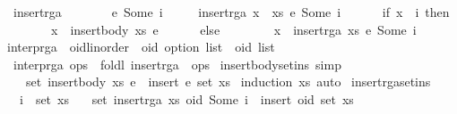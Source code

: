\begin{isabellebody}
\ \ {\isachardoublequoteopen}insert{\isacharunderscore}rga\ \ {\isacharbrackleft}{\isacharbrackright}\ \ \ \ \ \ {\isacharparenleft}e{\isacharcomma}\ Some\ i{\isacharparenright}\ {\isacharequal}\ {\isacharbrackleft}{\isacharbrackright}{\isachardoublequoteclose}\ {\isacharbar}\isanewline
\ \ {\isachardoublequoteopen}insert{\isacharunderscore}rga\ {\isacharparenleft}x\ {\isacharhash}\ xs{\isacharparenright}\ {\isacharparenleft}e{\isacharcomma}\ Some\ i{\isacharparenright}\ {\isacharequal}\isanewline
\ \ \ \ \ {\isacharparenleft}if\ x\ {\isacharequal}\ i\ then\isanewline
\ \ \ \ \ \ \ \ x\ {\isacharhash}\ insert{\isacharunderscore}body\ xs\ e\isanewline
\ \ \ \ \ \ else\isanewline
\ \ \ \ \ \ \ \ x\ {\isacharhash}\ insert{\isacharunderscore}rga\ xs\ {\isacharparenleft}e{\isacharcomma}\ Some\ i{\isacharparenright}{\isacharparenright}{\isachardoublequoteclose}\isanewline
\isanewline
{}\isamarkupfalse%
\ interp{\isacharunderscore}rga\ {\isacharcolon}{\isacharcolon}\ {\isachardoublequoteopen}{\isacharparenleft}{\isacharprime}oid{\isacharcolon}{\isacharcolon}{\isacharbraceleft}linorder{\isacharbraceright}\ {\isasymtimes}\ {\isacharprime}oid\ option{\isacharparenright}\ list\ {\isasymRightarrow}\ {\isacharprime}oid\ list{\isachardoublequoteclose}\ \isanewline
\ \ {\isachardoublequoteopen}interp{\isacharunderscore}rga\ ops\ {\isasymequiv}\ foldl\ insert{\isacharunderscore}rga\ {\isacharbrackleft}{\isacharbrackright}\ ops{\isachardoublequoteclose}%
\isamarkuptrue%
\isamarkupfalse%
\ insert{\isacharunderscore}body{\isacharunderscore}set{\isacharunderscore}ins\ {\isacharbrackleft}simp{\isacharbrackright}{\isacharcolon}\isanewline
\ \ \ \ {\isachardoublequoteopen}set\ {\isacharparenleft}insert{\isacharunderscore}body\ xs\ e{\isacharparenright}\ {\isacharequal}\ insert\ e\ {\isacharparenleft}set\ xs{\isacharparenright}{\isachardoublequoteclose}\isanewline
%
\isadelimproof
%
\endisadelimproof
%
\isatagproof
{}\isamarkupfalse%
\ {\isacharparenleft}induction\ xs{\isacharcomma}\ auto{\isacharparenright}%
\endisatagproof
{\isafoldproof}%
%
\isadelimproof
\isanewline
%
\endisadelimproof
\isanewline
{}\isamarkupfalse%
\ insert{\isacharunderscore}rga{\isacharunderscore}set{\isacharunderscore}ins{\isacharcolon}\isanewline
\ \ \ {\isachardoublequoteopen}i\ {\isasymin}\ set\ xs{\isachardoublequoteclose}\isanewline
\ \ \ {\isachardoublequoteopen}set\ {\isacharparenleft}insert{\isacharunderscore}rga\ xs\ {\isacharparenleft}oid{\isacharcomma}\ Some\ i{\isacharparenright}{\isacharparenright}\ {\isacharequal}\ insert\ oid\ {\isacharparenleft}set\ xs{\isacharparenright}{\isachardoublequoteclose}\isanewline

\end{isabellebody}
